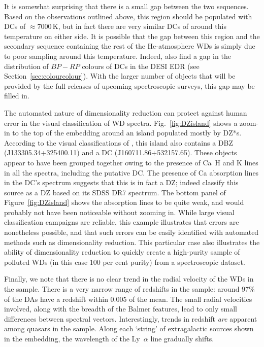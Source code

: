 \documentclass[fleqn,usenatbib]{mnras}
\begin{document}
It is somewhat surprising that there is a small gap between the two sequences.
Based on the observations outlined above, this region should be populated with DCs of $\approx7000\,\text{K}$, but in fact there are very similar DCs of around this temperature on either side.
It is possible that the gap between this region and the secondary sequence containing the rest of the He-atmosphere WDs is simply due to poor sampling around this temperature.
Indeed, \citet{manser24} also find a gap in the distribution of $\mathit{BP}-\mathit{RP}$ colours of DCs in the DESI EDR (see Section~\ref{sec:colourcolour}).
With the larger number of objects that will be provided by the full releases of upcoming spectroscopic surveys, this gap may be filled in.

The automated nature of dimensionality reduction can protect against human error in the visual classification of WD spectra.
Fig.~\ref{fig:DZisland} shows a zoom-in to the top of the embedding around an island populated mostly by DZ*s.
According to the visual classifications of \citet{manser24}, this island also contains a DBZ (J133305.34+325400.11) and a DC (J160711.86+532157.65).
These objects appear to have been grouped together owing to the presence of Ca~H and K lines in all the spectra, including the putative DC.
The presence of Ca absorption lines in the DC's spectrum suggests that this is in fact a DZ; indeed \citet{kleinman13} classify this source as a DZ based on its SDSS DR7 spectrum.
The bottom panel of Figure~\ref{fig:DZisland} shows the absorption lines to be quite weak, and would probably not have been noticeable without zooming in.
While large visual classification campaigns are reliable, this example illustrates that errors are nonetheless possible, and that such errors can be easily identified with automated methods such as dimensionality reduction.
This particular case also illustrates the ability of dimensionality reduction to quickly create a high-purity sample of polluted WDs (in this case 100 per cent purity) from a spectroscopic dataset.

Finally, we note that there is no clear trend in the radial velocity of the WDs in the sample.
There is a very narrow range of redshifts in the sample: around 97\% of the DAs have a redshift within 0.005 of the mean.
The small radial velocities involved, along with the breadth of the Balmer features, lead to only small differences between spectral vectors.
Interestingly, trends in redshift \textit{are} apparent among quasars in the sample.
Along each `string' of extragalactic sources shown in the embedding, the wavelength of the Ly~$\alpha$ line gradually shifts.
\end{document}

